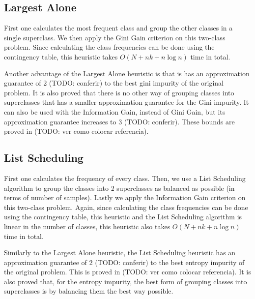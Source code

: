 \subsection{Largest Alone}
First one calculates the most frequent class and group the other classes in a single superclass. We then apply the Gini Gain criterion on this two-class problem. Since calculating the class frequencies can be done using the contingency table, this heuristic takes $O(N + n k + n \log n)$ time in total.

Another advantage of the Largest Alone heuristic is that is has an approximation guarantee of 2 (TODO: conferir) to the best gini impurity of the original problem. It is also proved that there is no other way of grouping classes into superclasses that has a smaller approximation guarantee for the Gini impurity. It can also be used with the Information Gain, instead of Gini Gain, but its approximation guarantee increases to 3 (TODO: conferir). These bounds are proved in (TODO: ver como colocar referencia).

\subsection{List Scheduling}
First one calculates the frequency of every class. Then, we use a List Scheduling algorithm to group the classes into 2 superclasses as balanced as possible (in terms of number of samples). Lastly we apply the Information Gain criterion on this two-class problem. Again, since calculating the class frequencies can be done using the contingency table, this heuristic and the List Scheduling algorithm is linear in the number of classes, this heuristic also takes $O(N + n k + n \log n)$ time in total.

Similarly to the Largest Alone heuristic, the List Scheduling heuristic has an approximation guarantee of 2 (TODO: conferir) to the best entropy impurity of the original problem. This is proved in (TODO: ver como colocar referencia). It is also proved that, for the entropy impurity, the best form of grouping classes into superclasses is by balancing them the best way possible.
